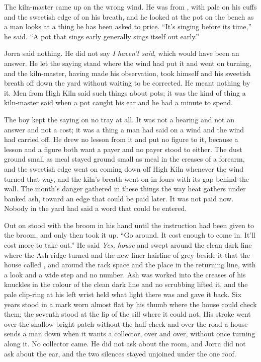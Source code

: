 The kiln-master came up on the wrong wind. He was from , with  pale on his cuffs and the sweetish edge of  on his breath, and he looked at the pot on the bench as a man looks at a thing he has been asked to price. “It’s singing before its time,” he said. “A pot that sings early generally sings itself out early.”

Jorra said nothing. He did not say \emph{I haven't said}, which would have been an answer. He let the saying stand where the wind had put it and went on turning, and the kiln-master, having made his observation, took himself and his sweetish breath off down the yard without waiting to be corrected. He meant nothing by it. Men from High Kiln said such things about pots; it was the kind of thing a kiln-master said when a pot caught his ear and he had a minute to spend.

The boy kept the saying on no tray at all. It was not a hearing and not an answer and not a cost; it was a thing a man had said on a wind and the wind had carried off. He drew no lesson from it and put no figure to it, because a lesson and a figure both want a payer and no payer stood to either. The dust ground small as meal stayed ground small as meal in the creases of a forearm, and the sweetish edge went on coming down off High Kiln whenever the wind turned that way, and the kiln's breath went on in fours with its gap behind the wall. The month's danger gathered in these things the way heat gathers under banked ash, toward an edge that could be paid later. It was not paid now. Nobody in the yard had said a word that could be entered.

\scenebreak

Out on   stood with the broom in his hand until the instruction had been given to the broom, and only then took it up. “Go around. It cost enough to come in. It’ll cost more to take out.” He said \emph{Yes, house} and swept around the clean dark line where the Ash ridge turned and the new finer hairline of grey beside it that the house called , and around the rack space and the place in the returning line, with a look and a wide step and no number. Ash was worked into the creases of his knuckles in the colour of the clean dark line and no scrubbing lifted it, and the pale clip-ring at his left wrist held what light there was and gave it back. Six years stood in a mark worn almost flat by his thumb where the house could check them; the seventh stood at the lip of the sill where it could not. His stroke went over the shallow bright patch without the half-check and over the road a house sends a man down when it wants a collector, over and over, without once turning along it. No collector came. He did not ask about the room, and Jorra did not ask about the ear, and the two silences stayed unjoined under the one roof.

